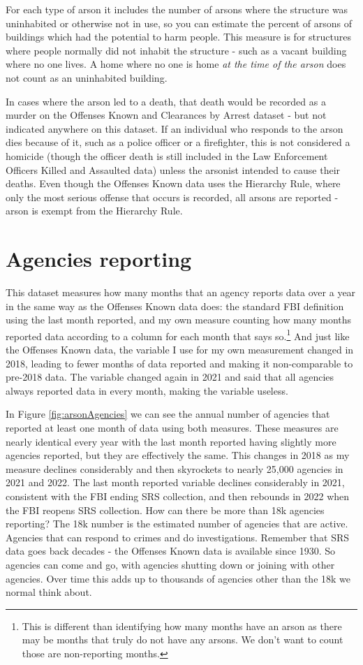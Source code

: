 \documentclass[
  12pt,
  openany]{book}
\begin{document}
For each type of arson it includes the number of arsons where the structure was uninhabited or otherwise not in use, so you can estimate the percent of arsons of buildings which had the potential to harm people. This measure is for structures where people normally did not inhabit the structure - such as a vacant building where no one lives. A home where no one is home \emph{at the time of the arson} does not count as an uninhabited building.

In cases where the arson led to a death, that death would be recorded as a murder on the Offenses Known and Clearances by Arrest dataset - but not indicated anywhere on this dataset. If an individual who responds to the arson dies because of it, such as a police officer or a firefighter, this is not considered a homicide (though the officer death is still included in the Law Enforcement Officers Killed and Assaulted data) unless the arsonist intended to cause their deaths. Even though the Offenses Known data uses the Hierarchy Rule, where only the most serious offense that occurs is recorded, all arsons are reported - arson is exempt from the Hierarchy Rule.

\section{Agencies reporting}\label{agencies-reporting-4}

This dataset measures how many months that an agency reports data over a year in the same way as the Offenses Known data does: the standard FBI definition using the last month reported, and my own measure counting how many months reported data according to a column for each month that says so.\footnote{This is different than identifying how many months have an arson as there may be months that truly do not have any arsons. We don't want to count those are non-reporting months.} And just like the Offenses Known data, the variable I use for my own measurement changed in 2018, leading to fewer months of data reported and making it non-comparable to pre-2018 data. The variable changed again in 2021 and said that all agencies always reported data in every month, making the variable useless.

In Figure \ref{fig:arsonAgencies} we can see the annual number of agencies that reported at least one month of data using both measures. These measures are nearly identical every year with the last month reported having slightly more agencies reported, but they are effectively the same. This changes in 2018 as my measure declines considerably and then skyrockets to nearly 25,000 agencies in 2021 and 2022. The last month reported variable declines considerably in 2021, consistent with the FBI ending SRS collection, and then rebounds in 2022 when the FBI reopens SRS collection. How can there be more than 18k agencies reporting? The 18k number is the estimated number of agencies that are active. Agencies that can respond to crimes and do investigations. Remember that SRS data goes back decades - the Offenses Known data is available since 1930. So agencies can come and go, with agencies shutting down or joining with other agencies. Over time this adds up to thousands of agencies other than the 18k we normal think about.
\end{document}

